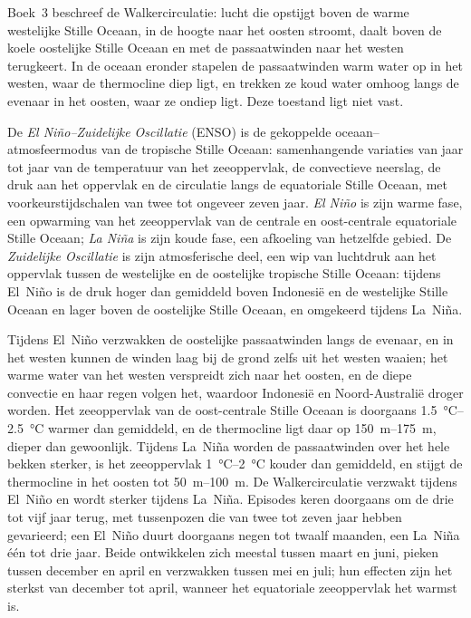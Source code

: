 Boek~3 beschreef de Walkercirculatie: lucht die opstijgt boven de warme westelijke Stille Oceaan,
in de hoogte naar het oosten stroomt, daalt boven de koele oostelijke Stille Oceaan en met de
passaatwinden naar het westen terugkeert. In de oceaan eronder stapelen de passaatwinden warm water op in het westen, waar de thermocline
diep ligt, en trekken ze koud water omhoog langs de evenaar in het oosten, waar ze ondiep ligt. Deze toestand ligt niet
vast.

\begin{definition}\label{def:b2:climate-variability:enso}
De \emph{El Niño--Zuidelijke Oscillatie} (ENSO) is de
gekoppelde oceaan--atmosfeermodus van de tropische Stille Oceaan: samenhangende variaties van jaar tot jaar van de
temperatuur van het zeeoppervlak, de convectieve neerslag, de druk aan het oppervlak en de circulatie langs
de equatoriale Stille Oceaan, met voorkeurstijdschalen van twee tot ongeveer zeven jaar. \emph{El
Niño} is zijn warme fase, een opwarming van het zeeoppervlak van de centrale en
oost-centrale equatoriale Stille Oceaan; \emph{La Niña} is zijn koude fase, een afkoeling van
hetzelfde gebied. De \emph{Zuidelijke Oscillatie} is zijn atmosferische deel,
een wip van luchtdruk aan het oppervlak tussen de westelijke en de oostelijke tropische Stille Oceaan: tijdens El~Niño
is de druk hoger dan gemiddeld boven Indonesië en de westelijke Stille Oceaan en lager boven de
oostelijke Stille Oceaan, en omgekeerd tijdens La~Niña.
\end{definition}

Tijdens El~Niño verzwakken de oostelijke passaatwinden langs de evenaar, en in het westen kunnen de
winden laag bij de grond zelfs uit het westen waaien; het warme water van het westen verspreidt zich naar het oosten, en de diepe
convectie en haar regen volgen het, waardoor Indonesië en Noord-Australië droger worden. Het zeeoppervlak
van de oost-centrale Stille Oceaan is doorgaans \qtyrange{1.5}{2.5}{\celsius} warmer dan gemiddeld, en
de thermocline ligt daar op \qtyrange{150}{175}{m}, dieper dan gewoonlijk. Tijdens La~Niña worden de
passaatwinden over het hele bekken sterker, is het zeeoppervlak \qtyrange{1}{2}{\celsius} kouder dan
gemiddeld, en stijgt de thermocline in het oosten tot \qtyrange{50}{100}{m}. De Walkercirculatie
verzwakt tijdens El~Niño en wordt sterker tijdens La~Niña. Episodes keren doorgaans om de drie tot
vijf jaar terug, met tussenpozen die van twee tot zeven jaar hebben gevarieerd; een El~Niño duurt doorgaans negen tot
twaalf maanden, een La~Niña één tot drie jaar. Beide ontwikkelen zich meestal tussen maart en juni,
pieken tussen december en april en verzwakken tussen mei en juli; hun effecten zijn het sterkst
van december tot april, wanneer het equatoriale zeeoppervlak het warmst is.

